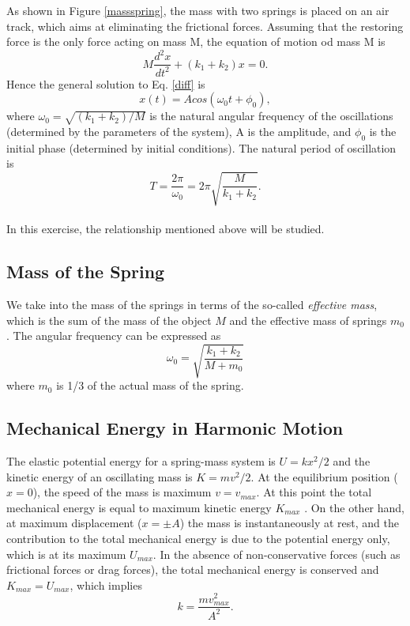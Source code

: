     As shown in Figure \ref{massspring}, the mass with two springs is placed on an air track, which aims at eliminating the frictional forces. Assuming that the restoring force is the only force acting on mass M, the equation of motion od mass M is
    \begin{equation}
        \label{diff}
        M\frac{d^2x}{dt^2}+(k_1+k_2)x=0.
    \end{equation}
    Hence the general solution to Eq. \ref{diff} is
    \begin{equation}
        x(t)=Acos(\omega_0t+\phi_0),
    \end{equation}
    where $\omega_0=\sqrt{(k_1+k_2)/M}$ is the natural angular frequency of the oscillations (determined by the parameters of the system), A is the amplitude, and $\phi_0$ is the initial phase (determined by initial conditions). The natural period of oscillation is
    \begin{equation}
        T=\frac{2\pi}{\omega_0}=2\pi\sqrt{\frac{M}{k_1+k_2}}.
    \end{equation}\\
    
    In this exercise, the relationship mentioned above will be studied.\\
    
\subsection{Mass of the Spring}
    We take into the mass of the springs in terms of the so-called \emph{effective mass}, which is the sum of the mass of the object $M$ and the effective mass of springs $m_0$. The angular frequency can be expressed as
    \begin{equation}
        \omega_0=\sqrt{\frac{k_1+k_2}{M+m_0}}
    \end{equation}
    where $m_0$ is 1/3 of the actual mass of the spring.

\subsection{Mechanical Energy in Harmonic Motion}
    The elastic potential energy for a spring-mass system is $U=kx^2/2$ and the kinetic energy of an oscillating mass is $K=mv^2/2$.    
    At the equilibrium position ($x=0$), the speed of the mass is maximum $v=v_{max}$. At this point the total mechanical energy is equal to maximum kinetic energy $K_{max}$ . On the other hand, at maximum displacement ($x=\pm A$) the mass is instantaneously at rest, and the contribution to the total mechanical energy is due to the potential energy only, which is at its maximum $U_{max}$. In the absence of non-conservative forces (such as frictional forces or drag forces), the total mechanical energy is conserved and $K_{max}=U_{max}$, which implies
    \begin{equation}
        k=\frac{mv_{max}^2}{A^2}.
    \end{equation}

